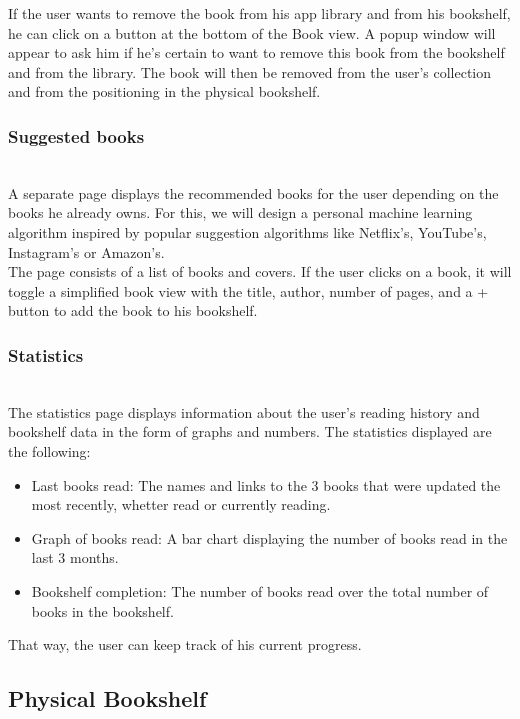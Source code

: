 \documentclass[conference]{IEEEtran}
\begin{document}
If the user wants to remove the book from his app library and from his bookshelf, he can click on a button at the bottom of the Book view. A popup window will appear to ask him if he's certain to want to remove this book from the bookshelf and from the library. The book will then be removed from the user's collection and from the positioning in the physical bookshelf.\\

\subsubsection{Suggested books}\hfill\\

A separate page displays the recommended books for the user depending on the books he already owns. For this, we will design a personal machine learning algorithm inspired by popular suggestion algorithms like Netflix's, YouTube's, Instagram's or Amazon's.\\
The page consists of a list of books and covers. If the user clicks on a book, it will toggle a simplified book view with the title, author, number of pages, and a + button to add the book to his bookshelf.\\

\subsubsection{Statistics}\hfill\\

The statistics page displays information about the user's reading history and bookshelf data in the form of graphs and numbers. The statistics displayed are the following:
\begin{itemize}
    \item Last books read: The names and links to the 3 books that were updated the most recently, whetter read or currently reading.
    \item Graph of books read: A bar chart displaying the number of books read in the last 3 months.
    \item Bookshelf completion: The number of books read over the total number of books in the bookshelf.
\end{itemize}
That way, the user can keep track of his current progress.

\subsection{Physical Bookshelf}
\end{document}
